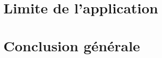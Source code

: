 \documentclass[a4paper,10pt]{article}
\begin{document}
\newpage
\section{Limite de l'application}

\newpage
\section{Conclusion générale}
\end{document}

